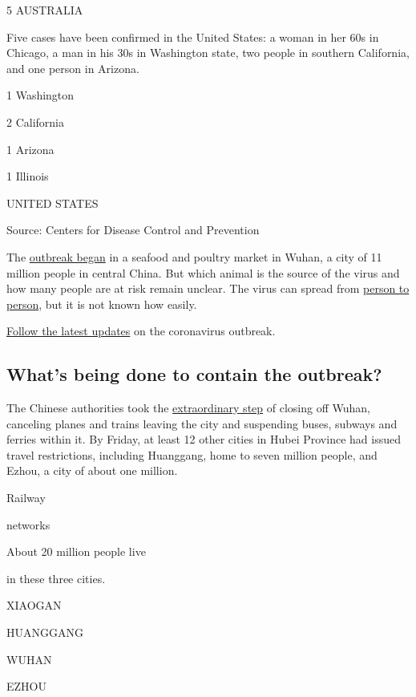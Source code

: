 5 AUSTRALIA

Five cases have been confirmed in the United States: a woman in her 60s
in Chicago, a man in his 30s in Washington state, two people in southern
California, and one person in Arizona.

1 Washington

2 California

1 Arizona

1 Illinois

UNITED STATES

Source: Centers for Disease Control and Prevention

The
\href{https://www.nytimes3xbfgragh.onion/2020/01/08/health/china-pneumonia-outbreak-virus.html}{outbreak
began} in a seafood and poultry market in Wuhan, a city of 11 million
people in central China. But which animal is the source of the virus and
how many people are at risk remain unclear. The virus can spread from
\href{https://www.nytimes3xbfgragh.onion/2020/01/20/world/asia/coronavirus-china-symptoms.html}{person
to person}, but it is not known how easily.

\href{https://www.nytimes3xbfgragh.onion/2020/01/28/world/asia/china-coronavirus.html}{Follow
the latest updates} on the coronavirus outbreak.

\hypertarget{whats-being-done-to-contain-the-outbreak}{%
\subsection{What's being done to contain the
outbreak?}\label{whats-being-done-to-contain-the-outbreak}}

The Chinese authorities took the
\href{https://www.nytimes3xbfgragh.onion/2020/01/22/world/asia/coronavirus-quarantines-history.html}{extraordinary
step} of closing off Wuhan, canceling planes and trains leaving the city
and suspending buses, subways and ferries within it. By Friday, at least
12 other cities in Hubei Province had issued travel restrictions,
including Huanggang, home to seven million people, and Ezhou, a city of
about one million.

Railway

networks

About 20 million people live

in these three cities.

XIAOGAN

HUANGGANG

WUHAN

EZHOU

